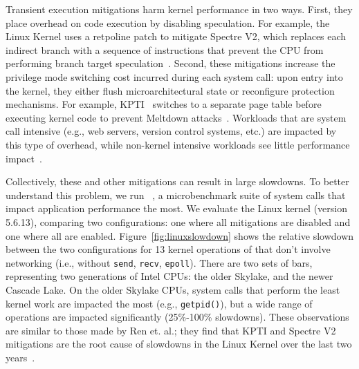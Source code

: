 Transient execution mitigations harm kernel performance in two
ways. First, they place overhead on code execution by disabling
speculation.  For example, the Linux Kernel uses a retpoline patch to
mitigate Spectre V2, which replaces each indirect branch with a
sequence of instructions that prevent the CPU from performing branch
target speculation~\cite{intel:retpoline}. Second, these mitigations
increase the privilege mode switching cost incurred during each system
call: upon entry into the kernel, they either flush microarchitectural
state or reconfigure protection mechanisms.  For example,
KPTI~\cite{gruss:kaiser,linux:kpti} switches to a separate page table
before executing kernel code to prevent Meltdown
attacks~\cite{lipp:meltdown}.  Workloads
that are system call intensive (e.g., web servers, version control
systems, etc.) are impacted by this type of overhead, while non-kernel
intensive workloads see little performance impact~\cite{gruss:kaiser}.

Collectively, these and other mitigations can result in large
slowdowns. To better understand this problem, we run
\bench~\cite{lebench}, a microbenchmark suite of system calls
that impact application
performance the most.  We evaluate the Linux kernel (version 5.6.13),
comparing two configurations: one where all mitigations are disabled
and one where all are enabled. Figure~\ref{fig:linuxslowdown} shows
the relative slowdown between the two configurations for 13 kernel
operations of \bench that don't involve networking (i.e., without
\texttt{send}, \texttt{recv}, \texttt{epoll}).  There are two sets of
bars, representing two generations of Intel CPUs: the older Skylake,
and the newer Cascade Lake.  On the older Skylake CPUs,
system calls that perform the least kernel work are impacted the most
(e.g., \texttt{getpid()}), but a wide range of operations are impacted
significantly (25\%-100\% slowdowns). These observations are similar
to those made by Ren et. al.; they find that KPTI and Spectre V2
mitigations are the root cause of slowdowns in the Linux
Kernel over the last two years~\cite{lebench}.

